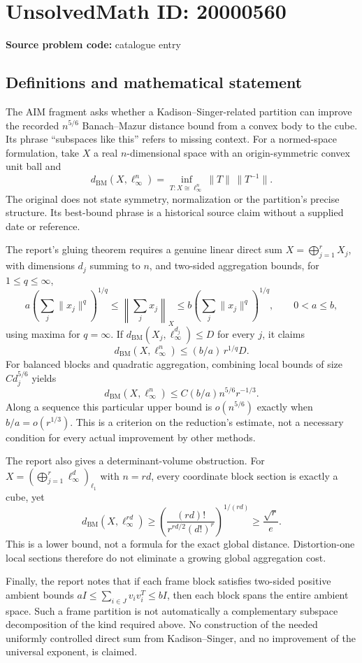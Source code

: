 \documentclass[11pt]{article}
\begin{document}
\section*{UnsolvedMath ID: 20000560}
\textbf{Source problem code:} catalogue entry
\subsection{Definitions and mathematical statement}
The AIM fragment asks whether a Kadison--Singer-related partition can improve the recorded $n^{5/6}$ Banach--Mazur distance bound from a convex body to the cube. Its phrase ``subspaces like this'' refers to missing context. For a normed-space formulation, take $X$ a real $n$-dimensional space with an origin-symmetric convex unit ball and
\[
 d_{\mathrm{BM}}(X,\ell_\infty^n)=\inf_{T:X\cong\ell_\infty^n}\|T\|\,\|T^{-1}\|.
\]
The original does not state symmetry, normalization or the partition's precise structure. Its best-bound phrase is a historical source claim without a supplied date or reference.

The report's gluing theorem requires a genuine linear direct sum $X=\bigoplus_{j=1}^rX_j$, with dimensions $d_j$ summing to $n$, and two-sided aggregation bounds, for $1\leq q\leq\infty$,
\[
 a\left(\sum_j\|x_j\|^q\right)^{1/q}
 \leq\left\|\sum_jx_j\right\|_X
 \leq b\left(\sum_j\|x_j\|^q\right)^{1/q},\qquad0<a\leq b,
\]
using maxima for $q=\infty$. If $d_{\mathrm{BM}}(X_j,\ell_\infty^{d_j})\leq D$ for every $j$, it claims
\[
 d_{\mathrm{BM}}(X,\ell_\infty^n)\leq(b/a)\,r^{1/q}D.
\]
For balanced blocks and quadratic aggregation, combining local bounds of size $C d_j^{5/6}$ yields
\[
 d_{\mathrm{BM}}(X,\ell_\infty^n)\leq C(b/a)n^{5/6}r^{-1/3}.
\]
Along a sequence this particular upper bound is $o(n^{5/6})$ exactly when $b/a=o(r^{1/3})$. This is a criterion on the reduction's estimate, not a necessary condition for every actual improvement by other methods.

The report also gives a determinant-volume obstruction. For $X=(\bigoplus_{j=1}^r\ell_\infty^d)_{\ell_1}$ with $n=rd$, every coordinate block section is exactly a cube, yet
\[
 d_{\mathrm{BM}}(X,\ell_\infty^{rd})\geq
 \left(\frac{(rd)!}{r^{rd/2}(d!)^r}\right)^{1/(rd)}
 \geq\frac{\sqrt r}{e}.
\]
This is a lower bound, not a formula for the exact global distance. Distortion-one local sections therefore do not eliminate a growing global aggregation cost.

Finally, the report notes that if each frame block satisfies two-sided positive ambient bounds $aI\leq\sum_{i\in J}v_iv_i^T\leq bI$, then each block spans the entire ambient space. Such a frame partition is not automatically a complementary subspace decomposition of the kind required above. No construction of the needed uniformly controlled direct sum from Kadison--Singer, and no improvement of the universal exponent, is claimed.
\end{document}
